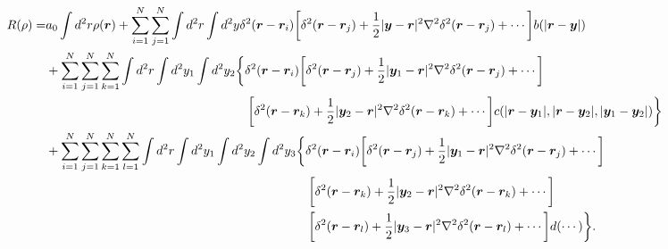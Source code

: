 \documentclass{article}
\begin{document}
\begin{align}
  R(\rho) = &a_0\int d^2r\rho(\bm{r})+\sum_{i=1}^N\sum_{j=1}^N\int d^2r \int d^2y
              \delta^2(\bm{r}-\bm{r}_i)\bigg[\delta^2(\bm{r}-\bm{r}_j)
              +\frac{1}{2}|\bm{y}-\bm{r}|^2\nabla^2\delta^2(\bm{r}-\bm{r}_j)+\cdots\bigg]
              b(|\bm{r}-\bm{y}|)\nonumber\\
            &+\sum_{i=1}^N\sum_{j=1}^N\sum_{k=1}^N\int d^2r \int d^2y_1\int d^2y_2
              \bigg\{\delta^2(\bm{r}-\bm{r}_i)\bigg[\delta^2(\bm{r}-\bm{r}_j)
              +\frac{1}{2}|\bm{y}_1-\bm{r}|^2\nabla^2\delta^2(\bm{r}-\bm{r}_j)
              +\cdots\bigg]\nonumber\\
            &\hphantom{+\sum_{i=1}^N\sum_{j=1}^N\sum_{k=1}^N\int d^2r \int d^2y_1
              \int d^2y_2\bigg\{\}}
              \bigg[\delta^2(\bm{r}-\bm{r}_k)+\frac{1}{2}|\bm{y}_2-\bm{r}|^2
              \nabla^2\delta^2(\bm{r}-\bm{r}_k)+\cdots\bigg]
              c(|\bm{r}-\bm{y}_1|,|\bm{r}-\bm{y}_2|,|\bm{y}_1-\bm{y}_2|)\bigg\}\nonumber\\
            &+\sum_{i=1}^N\sum_{j=1}^N\sum_{k=1}^N\sum_{l=1}^N\int d^2r \int d^2y_1
              \int d^2y_2\int d^2y_3\bigg\{\delta^2(\bm{r}-\bm{r}_i)
              \bigg[\delta^2(\bm{r}-\bm{r}_j)+\frac{1}{2}|\bm{y}_1-\bm{r}|^2
              \nabla^2\delta^2(\bm{r}-\bm{r}_j)+\cdots\bigg]\nonumber\\
            &\hphantom{+\sum_{i=1}^N\sum_{j=1}^N\sum_{k=1}^N\sum_{l=1}^N\int d^2r \int d^2y_1
              \int d^2y_2\int d^2y_3\bigg\{\}}
              \bigg[\delta^2(\bm{r}-\bm{r}_k)+\frac{1}{2}|\bm{y}_2-\bm{r}|^2
              \nabla^2\delta^2(\bm{r}-\bm{r}_k)+\cdots\bigg]\nonumber\\
            &\hphantom{+\sum_{i=1}^N\sum_{j=1}^N\sum_{k=1}^N\sum_{l=1}^N\int d^2r \int d^2y_1
              \int d^2y_2\int d^2y_3\bigg\{\}}
              \bigg[\delta^2(\bm{r}-\bm{r}_l)+\frac{1}{2}|\bm{y}_3-\bm{r}|^2
              \nabla^2\delta^2(\bm{r}-\bm{r}_l)+\cdots\bigg]d(\cdots)\bigg\}.
\end{align}
\end{document}
